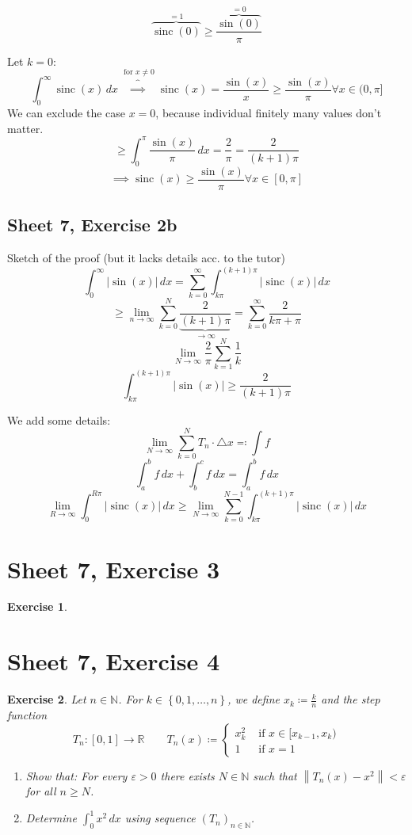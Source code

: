 \documentclass{article}
\newtheorem{ex}{Exercise} %
\newcommand{\set}[1]{\left\{#1\right\}}
\newcommand{\norm}[1]{\left\|#1\right\|}
\newcommand{\card}[1]{\left|#1\right|}
\begin{document}
\[ \overbrace{\operatorname{sinc}(0)}^{=1} \geq \frac{\overbrace{\sin(0)}^{=0}}{\pi} \]

Let $k=0$:
\[ \int_0^\infty \operatorname{sinc}(x) \, dx \overbrace{\implies}^{\text{ for } x \neq 0} \operatorname{sinc}(x) = \frac{\sin(x)}{x} \geq \frac{\sin(x)}{\pi} \forall x \in (0, \pi] \]
We can exclude the case $x = 0$, because individual finitely many values don't matter.
\[ \geq \int_0^\pi \frac{\sin(x)}{\pi} \, dx = \frac2\pi = \frac{2}{(k+1)\pi} \]
\[ \implies \operatorname{sinc}(x) \geq \frac{\sin(x)}{\pi} \forall x \in [0,\pi] \]

\subsection{Sheet 7, Exercise 2b}
Sketch of the proof (but it lacks details acc. to the tutor)
\[ \int_0^\infty \card{\sin(x)} \, dx = \sum_{k=0}^\infty \int_{k\pi}^{(k+1)\pi} \card{\operatorname{sinc}(x)} \, dx \]
\[ \geq \lim_{n\to\infty} \sum_{k=0}^N \underbrace{\frac{2}{(k+1)\pi}}_{\to \infty} = \sum_{k=0}^\infty \frac{2}{k\pi + \pi} \]
\[ \lim_{N\to\infty} \frac2\pi \sum_{k=1}^N \frac{1}{k} \]
\[ \int_{k\pi}^{(k+1)\pi} \card{\sin(x)} \geq \frac{2}{(k+1)\pi} \]

We add some details:
\[ \lim_{N\to\infty} \sum_{k=0}^N T_n \cdot \triangle x \eqqcolon \int f \]
\[ \int_a^b f \, dx + \int_b^c f \, dx = \int_a^b f \, dx \]
\[ \lim_{R\to\infty} \int_0^{R\pi} \card{\operatorname{sinc}(x)} \, dx \geq \lim_{N\to\infty} \sum_{k=0}^{N-1} \int_{k\pi}^{(k+1)\pi} \card{\operatorname{sinc}(x)} \, dx \]

\section{Sheet 7, Exercise 3}
\begin{ex}
\end{ex}

\section{Sheet 7, Exercise 4}
\begin{ex}
  Let $n \in \mathbb N$. For $k \in \set{0,1,\dots,n}$, we define $x_k \coloneqq \frac{k}{n}$ and the step function
  \[ T_n: [0,1] \to \mathbb R \qquad T_n(x) \coloneqq \begin{cases} x_k^2 & \text{ if } x \in [x_{k-1}, x_k) \\ 1 & \text{ if } x = 1 \end{cases} \]
  \begin{enumerate}
    \item Show that: For every $\varepsilon > 0$ there exists $N \in \mathbb N$ such that $\norm{T_n(x) - x^2} < \varepsilon$ for all $n \geq N$.
    \item Determine $\int_0^1 x^2 \, dx$ using sequence $(T_n)_{n\in\mathbb N}$.
  \end{enumerate}
\end{ex}
\end{document}
